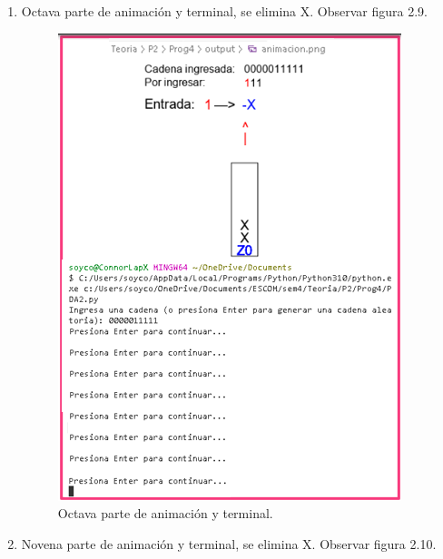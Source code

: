 \begin{enumerate}
\newpage
\item Octava parte de animación y terminal, se elimina X. Observar figura 2.9.

\begin{figure}[h]
    \begin{center}
    \includegraphics[width=0.6\linewidth]{Images/Cap9.png}
    \end{center}
\caption{Octava parte de animación y terminal.}
\label{fig:imagen}
\end{figure}

\newpage
\item Novena parte de animación y terminal, se elimina X. Observar figura 2.10.


\end{enumerate}
